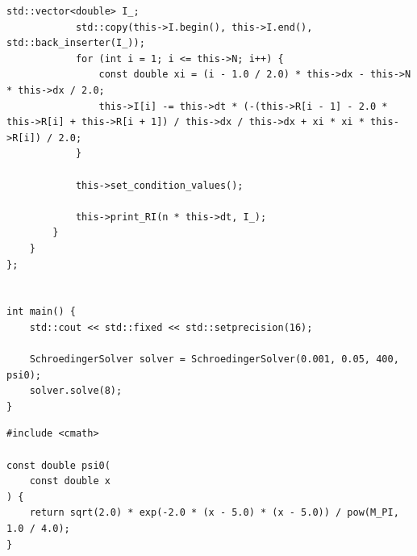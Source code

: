 \documentclass[a4j, titlepage]{jsarticle}
\numberwithin{equation}{section}
\begin{document}
\begin{lstlisting}[caption=オイラー陽解法によるSchr\"{o}dinger方程式の解法, label=src:schroedinger]
            std::vector<double> I_;
            std::copy(this->I.begin(), this->I.end(), std::back_inserter(I_));
            for (int i = 1; i <= this->N; i++) {
                const double xi = (i - 1.0 / 2.0) * this->dx - this->N * this->dx / 2.0;
                this->I[i] -= this->dt * (-(this->R[i - 1] - 2.0 * this->R[i] + this->R[i + 1]) / this->dx / this->dx + xi * xi * this->R[i]) / 2.0;
            }

            this->set_condition_values();
            
            this->print_RI(n * this->dt, I_);
        }
    }
};


int main() {
    std::cout << std::fixed << std::setprecision(16);

    SchroedingerSolver solver = SchroedingerSolver(0.001, 0.05, 400, psi0);
    solver.solve(8);
}\end{lstlisting}
            \begin{lstlisting}[caption=$\psi_0(x)$の実装, label=src:psi0]
#include <cmath>

const double psi0(
    const double x
) {
    return sqrt(2.0) * exp(-2.0 * (x - 5.0) * (x - 5.0)) / pow(M_PI, 1.0 / 4.0);
}\end{lstlisting}
\end{document}
